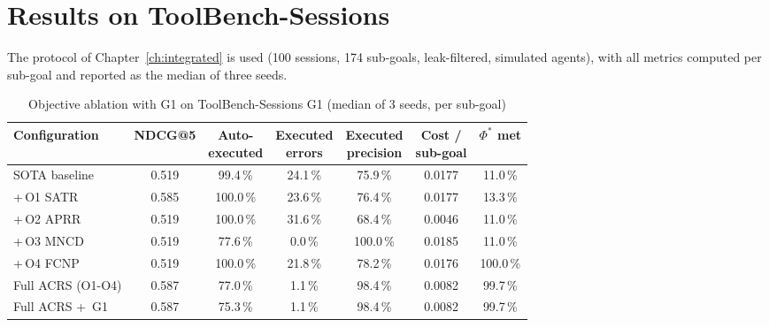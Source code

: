 \section{Results on ToolBench-Sessions}
\label{sec:gov-results-tb}

The protocol of Chapter~\ref{ch:integrated} is used (100 sessions, 174 sub-goals, leak-filtered,
simulated agents), with all metrics computed per sub-goal and reported as the median of three seeds.

\begin{table}[htbp]
  \centering
  \caption{Objective ablation with G1 on ToolBench-Sessions G1 (median of 3 seeds, per sub-goal)}
  \label{tab:gtb-ablation}
  \footnotesize\setlength{\tabcolsep}{3pt}
  \begin{tabular}{@{}lcccccc@{}}
    \toprule
    Configuration & NDCG@5 & \makecell{Auto-\\executed} & \makecell{Executed\\errors} & \makecell{Executed\\precision} & \makecell{Cost /\\sub-goal} & \makecell{$\Phi^\ast$\\met} \\
    \midrule
    SOTA baseline & 0.519 & 99.4\,\% & 24.1\,\% & 75.9\,\% & 0.0177 & 11.0\,\% \\
    +\,O1 SATR & 0.585 & 100.0\,\% & 23.6\,\% & 76.4\,\% & 0.0177 & 13.3\,\% \\
    +\,O2 APRR & 0.519 & 100.0\,\% & 31.6\,\% & 68.4\,\% & 0.0046 & 11.0\,\% \\
    +\,O3 MNCD & 0.519 & 77.6\,\% & 0.0\,\% & 100.0\,\% & 0.0185 & 11.0\,\% \\
    +\,O4 FCNP & 0.519 & 100.0\,\% & 21.8\,\% & 78.2\,\% & 0.0176 & 100.0\,\% \\
    Full ACRS (O1-O4) & 0.587 & 77.0\,\% & 1.1\,\% & 98.4\,\% & 0.0082 & 99.7\,\% \\
    Full ACRS +\, G1 & 0.587 & 75.3\,\% & 1.1\,\% & 98.4\,\% & 0.0082 & 99.7\,\% \\
    \bottomrule
  \end{tabular}
\end{table}

